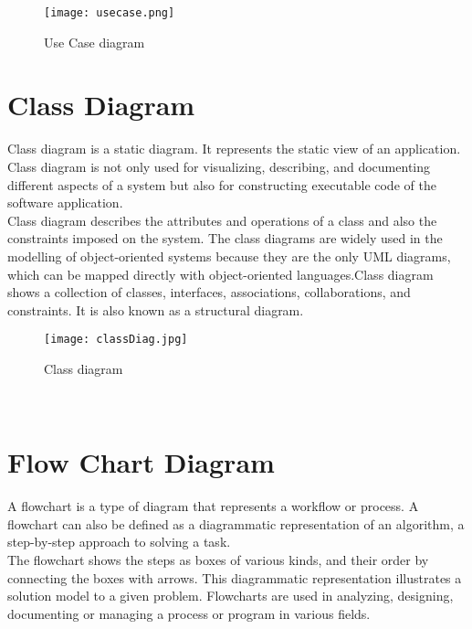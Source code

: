 \documentclass[12pt,a4paper]{report}
\begin{document}
\begin{figure}[ht]
	\begin{center}
		\texttt{[image: usecase.png]}
	\end{center}
	\caption{Use Case diagram}
\end{figure}
\newpage

\section{Class Diagram}
Class diagram is a static diagram. It represents the static view of an application. Class diagram is not only used for visualizing, describing, and documenting different aspects of a system but also for constructing executable code of the software application.\\
\hspace*{35pt}Class diagram describes the attributes and operations of a class and also the constraints imposed on the system. The class diagrams are widely used in the modelling of object-oriented systems because they are the only UML diagrams, which can be mapped directly with object-oriented languages.Class diagram shows a collection of classes, interfaces, associations, collaborations, and constraints. It is also known as a structural diagram. \\

\begin{figure}[ht]
	\begin{center}
		\texttt{[image: classDiag.jpg]}
	\end{center}
	\caption{Class diagram}
\end{figure}\\

\newpage
\section{Flow Chart Diagram}
A flowchart is a type of diagram that represents a workflow or process. A flowchart can also be defined as a diagrammatic representation of an algorithm, a step-by-step approach to solving a task.\\
\hspace*{35pt}The flowchart shows the steps as boxes of various kinds, and their order by connecting the boxes with arrows. This diagrammatic representation illustrates a solution model to a given problem. Flowcharts are used in analyzing, designing, documenting or managing a process or program in various fields.\\
\end{document}
